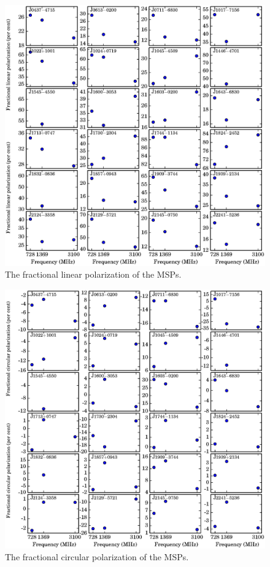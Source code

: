 \documentclass[useAMS,usenatbib]{mn2e}
\begin{document}
\begin{figure}
\begin{center}
\includegraphics[width=6 in]{linear.ps}
\caption{The fractional linear polarization of the MSPs.} 
\label{linear}
\end{center}
\end{figure}

\begin{figure}
\begin{center}
\includegraphics[width=6 in]{circular.ps}
\caption{The fractional circular polarization of the MSPs.} 
\label{circular}
\end{center}
\end{figure}
\end{document}
